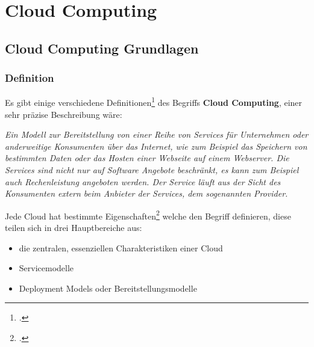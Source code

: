 \chapter{Cloud Computing}
\putz
\section{Cloud Computing Grundlagen}
\subsection{Definition}
Es gibt einige verschiedene Definitionen\footcite{Lehrunterlagen-HTL} des Begriffs \textbf{Cloud Computing}, einer sehr präzise Beschreibung wäre:

\begin{center}
   \textit{Ein Modell zur Bereitstellung von einer Reihe von Services für Unternehmen oder anderweitige Konsumenten über das Internet, wie zum Beispiel das
	Speichern von bestimmten Daten oder das Hosten einer Webseite auf einem Webserver. Die Services sind nicht nur auf Software Angebote beschränkt, es kann zum Beispiel auch Rechenleistung
	angeboten werden. Der Service läuft aus der Sicht des Konsumenten extern beim Anbieter der Services, dem sogenannten Provider.}
\end{center}

Jede Cloud hat bestimmte Eigenschaften\footcite{cloud-servicemodelle} welche den Begriff definieren, diese teilen sich in drei Hauptbereiche aus:
\begin{itemize}
	\item die zentralen, essenziellen Charakteristiken einer Cloud
	\item Servicemodelle
	\item Deployment Models oder Bereitstellungsmodelle
\end{itemize}

